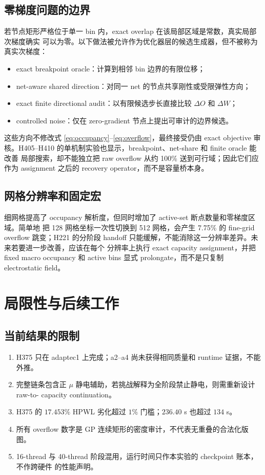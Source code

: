 \documentclass[UTF8,a4paper,11pt]{ctexrep}
\begin{document}
\section{零梯度问题的边界}
若节点矩形严格位于单一 bin 内，exact overlap 在该局部区域是常数，真实局部次梯度确实
可以为零。以下做法被允许作为优化器层的候选生成器，但不被称为真实次梯度：
\begin{itemize}
  \item exact breakpoint oracle：计算到相邻 bin 边界的有限位移；
  \item net-aware shared direction：对同一 net 的节点共享刚性或受限弹性方向；
  \item exact finite directional audit：以有限候选步长直接比较 $\Delta O$ 和 $\Delta W$；
  \item controlled noise：仅在 zero-gradient 节点上提出可审计的边界候选。
\end{itemize}
这些方向不修改式 \eqref{eq:occupancy}--\eqref{eq:overflow}，最终接受仍由 exact objective
审核。H405--H410 的单机制实验也显示，breakpoint、net-share 和 finite oracle 能改善
局部搜索，却不能独立把 raw overflow 从约 100\% 送到可行域；因此它们应作为 assignment
之后的 recovery operator，而不是容量桥本身。

\section{网格分辨率和固定宏}
细网格提高了 occupancy 解析度，但同时增加了 active-set 断点数量和零梯度区域。简单地
把 128 网格坐标一次性切换到 512 网格，会产生 7.75\% 的 fine-grid overflow 跳变；H221
的分阶段 handoff 只能缓解，不能消除这一分辨率差异。未来若要进一步改善，应该在每个
分辨率上执行 exact capacity assignment，并把 fixed macro occupancy 和 active bins 显式
prolongate，而不是只复制 electrostatic field。

\chapter{局限性与后续工作}

\section{当前结果的限制}
\begin{enumerate}
  \item H375 只在 adaptec1 上完成；a2--a4 尚未获得相同质量和 runtime 证据，不能外推。
  \item 完整链条包含正 $\mu$ 静电辅助，若挑战解释为全阶段禁止静电，则需重新设计 raw-to-
        capacity continuation。
  \item H375 的 $17.453\%$ HPWL 劣化超过 $1\%$ 门槛；$236.40$ s 也超过 $134$ s。
  \item 所有 overflow 数字是 GP 连续矩形的密度审计，不代表无重叠的合法化版图。
  \item 16-thread 与 40-thread 阶段混用，运行时间只作本实验的 checkpoint 账本，不作跨硬件
        的性能声明。
\end{enumerate}
\end{document}

